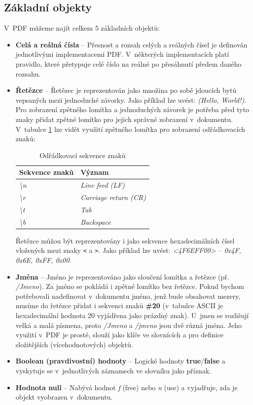 \subsection{Základní objekty}
V~PDF můžeme najít celkem 5 základních objektů:
	\begin{itemize}
		\item \textbf{Celá a reálná čísla} --  Přesnost a rozsah celých a reálných čísel je definován jednotlivými implementacemi PDF. V~některých implementacích platí pravidlo, které přetypuje celé číslo na reálné po přesáhnutí předem daného rozsahu.
		\item \textbf{Řetězce} -- Řetězec je reprezentován jako množina po sobě jdoucích bytů vepsaných mezi jednoduché závorky. Jako příklad lze uvést: \textit{(Hello, World!)}. Pro zobrazení zpětného lomítka a jednoduchých závorek je potřeba před tyto znaky přidat zpětné lomítko pro jejich správné zobrazení v~dokumentu. V~tabulce \ref{tab:table_escaped} lze vidět využití zpětného lomítka pro zobrazení odřádkovacích znaků:
			\begin{table}[h!]
			\centering
			\begin{tabular}{|l|l|} 
			\hline
			\textbf{Sekvence znaků}    & \textbf{Význam}                \\ 
			\hline
			\textit{\textbackslash{}n} & \textit{Line feed (LF)}        \\ 
			\hline
			\textit{\textbackslash{}r} & \textit{Carriage return (CR)}  \\ 
			\hline
			\textit{\textbackslash{}t} & \textit{Tab}                   \\ 
			\hline
			\textit{\textbackslash{}b} & \textit{Backspace}                      \\
			\hline
			\end{tabular}
			\caption{Odřádkovací sekvence znaků}
			\label{tab:table_escaped}
			\end{table}
		\newline Řetězce můžou být reprezentovány i jako sekvence hexadecimálních čísel vložených mezi znaky \verb|<| a \verb|>|. 
		\newline Jako příklad lze uvést: \textit{<4F6EFF00> -- 0x4F, 0x6E, 0xFF, 0x00}.

		\item \textbf{Jména} -- Jméno je reprezentováno jako sloučení lomítka a řetězce (př. \textit{/Jmeno}). Za jméno se pokládá i zpětné lomítko bez řetězce. Pokud bychom potřebovali nadefinovat v~dokumentu jméno, jenž bude obsahovat mezery, musíme do řetězce přidat i sekvenci znaků \textbf{\#20} (v~tabulce ASCII je hexadecimální hodnota 20 vyjádřena jako prázdný znak). U~jmen se rozlišují velká a malá písmena, proto \textit{/Jmeno} a \textit{/jmeno} jsou dvě různá jména. Jeho využití v~PDF je prosté, slouží jako klíče ve slovnících a pro definice složitějších (vícehodnotových) objektů.
		\item \textbf{Boolean (pravdivostní) hodnoty} -- Logické hodnoty \textbf{true}/\textbf{false} a vyskytuje se v~jednotlivých záznamech ve slovníku jako příznak.
		\item \textbf{Hodnota null} -- Nabývá hodnot \textit{f} (free) nebo \textit{n} (use) a vyjadřuje, zda je objekt vyobrazen v~dokumentu.
	\end{itemize}
